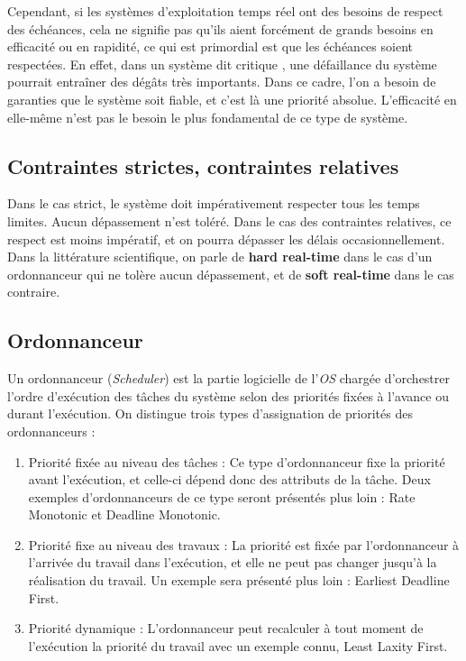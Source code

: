 \documentclass[11pt,a4paper,oneside]{report}
\newcommand{\customhighlight}[1]{{\textbf{#1}}}
\begin{document}
	Cependant, si les systèmes d'exploitation temps réel ont des besoins de respect des échéances, 
	cela ne signifie pas qu'ils aient forcément de grands besoins en efficacité ou en rapidité, ce qui 
	est primordial est que les échéances soient respectées. 
	En effet, dans un système dit \og critique\fg{} , une défaillance du système pourrait entraîner des dégâts 
	très importants. 
	Dans ce cadre, l'on a besoin de garanties que le système soit fiable, et c'est là une priorité absolue.
	L'efficacité en elle-même n'est pas le besoin le plus fondamental de ce type de système.\medskip
	
	\subsection{Contraintes strictes, contraintes relatives} 
	Dans le cas strict, le système doit impérativement respecter tous les temps limites. Aucun dépassement n'est toléré. Dans le cas des contraintes relatives, ce respect 
	est moins impératif, et on pourra dépasser les délais occasionnellement. \medskip
	Dans la littérature scientifique, on parle de \customhighlight{hard real-time} dans le cas d'un ordonnanceur 
	qui ne tolère aucun dépassement, et de \customhighlight{soft real-time} dans le cas contraire.
	
	\subsection{Ordonnanceur}
	Un ordonnanceur (\textit{Scheduler}) est la partie logicielle de 
	l'\textit{OS} chargée d'orchestrer l'ordre d'exécution des tâches du système 
	selon des priorités fixées à l'avance ou durant l'exécution. 
	On distingue trois types d'assignation de priorités des ordonnanceurs :
	
	
	\begin{enumerate}
		\item Priorité fixée au niveau des tâches : Ce type d'ordonnanceur fixe la priorité 
		avant l'exécution, et celle-ci dépend donc des attributs de la tâche. 
		Deux exemples d'ordonnanceurs de ce type seront présentés plus loin : Rate Monotonic et 
		Deadline Monotonic.
		\item Priorité fixe au niveau des travaux : La priorité est fixée par l'ordonnanceur à l'arrivée du travail 
		dans l'exécution, et elle ne peut pas changer jusqu'à la réalisation du travail. Un exemple sera présenté plus loin : Earliest Deadline First.
		\item Priorité dynamique : L'ordonnanceur peut recalculer à tout moment de l'exécution 
		la priorité du travail avec un exemple connu, Least Laxity First.
	\end{enumerate}
	
\end{document}
